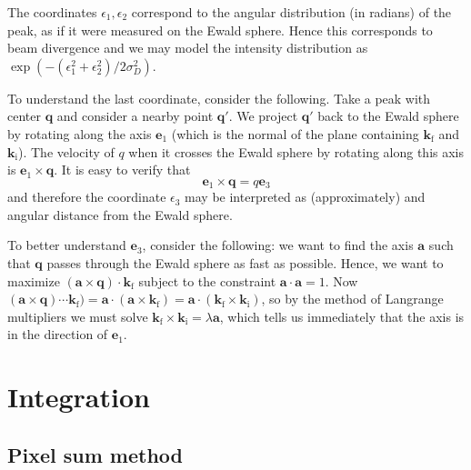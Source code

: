 \documentclass[11pt,a4paper]{article}
\def\v#1{\bm{{#1}}}
\def\si{\text{i}}
\def\sf{\text{f}}
\def\ba{\v{a}}
\def\be{{\v{e}}}
\def\k{{\v{k}}}
\def\q{{\v{q}}}
\begin{document}
The coordinates $\epsilon_1, \epsilon_2$ correspond to the angular distribution (in radians) of the peak, as if it were measured on the Ewald sphere. Hence this corresponds to beam divergence and we may model the intensity distribution as $\exp(-(\epsilon_1^2 + \epsilon_2^2)/2 \sigma_D^2)$.

To understand the last coordinate, consider the following. Take a peak with center $\q$ and consider a nearby point $\q'$. We project $\q'$ back to the Ewald sphere by rotating along the axis $\be_1$ (which is the normal of the plane containing $\k_\sf$ and $\k_\si$). The velocity of $q$ when it crosses the Ewald sphere by rotating along this axis is $\be_1 \times \q$. It is easy to verify that
\begin{equation} \be_1 \times \q = q \be_3 \end{equation}
and therefore the coordinate $\epsilon_3$ may be interpreted as (approximately) and angular distance from the Ewald sphere.

To better understand $\be_3$, consider the following: we want to find the axis $\ba$ such that $\q$ passes through the Ewald sphere as fast as possible. Hence, we want to maximize $(\ba \times \q) \cdot \k_\sf$ subject to the constraint $\ba \cdot \ba = 1$.
Now $(\ba \times \q) \cdots \k_\sf) = \ba \cdot (\ba \times \k_\sf) = \ba \cdot (\k_\sf \times \k_\si)$, so by the method of Langrange multipliers we must solve $\k_\sf \times \k_\si = \lambda \ba$, which tells us immediately that the axis is in the direction of $\be_1$.


\section{Integration} \label{integration}

\subsection{Pixel sum method}
\end{document}
